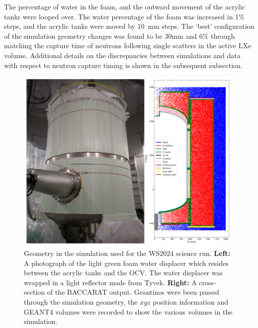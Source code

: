 The percentage of water in the foam, and the outward movement of the acrylic tanks were looped over.
The water percentage of the foam was increased in 1\% steps, and the acrylic tanks were moved by 10~mm steps.
The `best' configuration of the simulation geometry changes was found to be 30mm and 6\% through matching the capture time of neutrons following single scatters in the active LXe volume. Additional details on the discrepancies between simulations and data with respect to neutron capture timing is shown in the subsequent subsection.
\begin{figure}[ht!]
	\centering
	\includegraphics[width=\textwidth]{figures/VetoEfficiency/FoamImgAndSimGeoTogether.png}
	\caption{Geometry in the simulation used for the WS2024 science run. \textbf{Left:} A photograph of the light green foam water displacer which resides between the acrylic tanks and the OCV. The water displacer was wrapped in a light reflector made from Tyvek. \textbf{Right:} A cross-section of the BACCARAT output. Geantinos were been passed through the simulation geometry, the $xyz$ position information and GEANT4 volumes were recorded to show the various volumes in the simulation.}
	\label{fig:od_geometry_for_sr3}
\end{figure}

